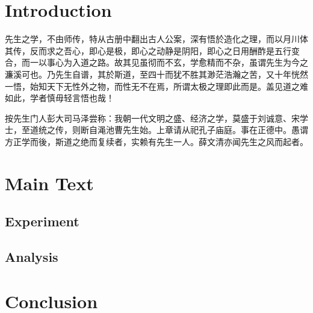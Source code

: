 \documentclass[
    author = Sweet Pastry,
    affiliation = Fudan University,
    column = onecolumn,
    ref = refDemo.bib,
    lang = cn
]{spArticle}
\begin{document}
    \section{Introduction}
    先生之学，不由师传，特从古册中翻出古人公案，深有悟於造化之理，而以月川体其传，反而求之吾心，即心是极，即心之动静是阴阳，即心之日用酬酢是五行变合，而一以事心为入道之路。故其见虽彻而不玄，学愈精而不杂，虽谓先生为今之濂溪可也。乃先生自谱，其於斯道，至四十而犹不胜其渺茫浩瀚之苦，又十年恍然一悟，始知天下无性外之物，而性无不在焉，所谓太极之理即此而是。盖见道之难如此，学者慎毋轻言悟也哉！

    按先生门人彭大司马泽尝称：我朝一代文明之盛、经济之学，莫盛于刘诚意、宋学士，至道统之传，则断自渑池曹先生始。上章请从祀孔子庙庭。事在正德中。愚谓方正学而後，斯道之绝而复续者，实赖有先生一人。薛文清亦闻先生之风而起者。

    \section{Main Text}
        \subsection{Experiment}
            \lipsum[6-8]
        \subsection{Analysis}
            \lipsum[9-11]

    \section{Conclusion}
        \lipsum[12-14]
\end{document}
